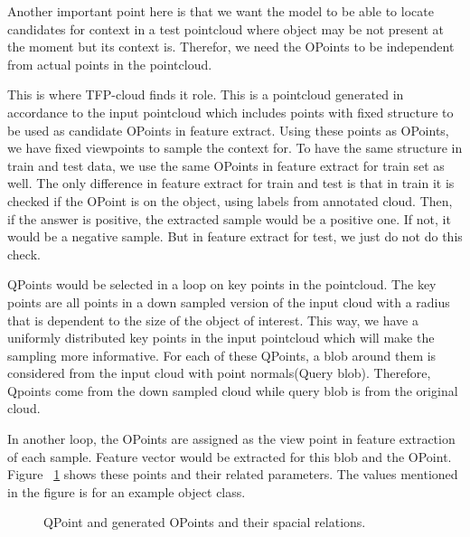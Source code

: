 Another important point here is that we want the model to be able to locate candidates for context in a test pointcloud where 
object may be not present at the moment but its context is.
Therefor, we need the OPoints to be independent from actual points in the pointcloud.

This is where TFP-cloud finds it role.
This is a pointcloud generated in accordance to the input pointcloud which includes points with fixed structure to be used as 
candidate OPoints in feature extract.
Using these points as OPoints, we have fixed viewpoints to sample the context for. 
To have the same structure in train and test data, we use the same OPoints in feature extract for train set as well.
The only difference in feature extract for train and test is that in train it is checked if the OPoint is on the object, using 
labels from annotated cloud. 
Then, if the answer is positive, the extracted sample would be a positive one. 
If not, it would be a negative sample. 
But in feature extract for test, we just do not do this check.

QPoints would be selected in a loop on key points in the pointcloud. 
The key points are all points in a down sampled version of the input cloud with a radius that is dependent to the 
size of the object of interest. 
This way, we have a uniformly distributed key points in the input pointcloud which will make the sampling more informative.
For each of these QPoints, a blob around them is considered from the input cloud with point normals(Query blob).
Therefore, Qpoints come from the down sampled cloud while query blob is from the original cloud.

In another loop, the OPoints are assigned  as the view point in feature extraction of each sample. 
Feature vector would be extracted for this blob and the OPoint. 
Figure ~\ref{PointParameters_Diagram.figure} shows these points and their related parameters. 
The values mentioned in the figure is for an example object class.

\begin{figure}[t]
  \caption[Feature extract structure]
  {QPoint and generated OPoints and their spacial relations.}
  \label{PointParameters_Diagram.figure}
\end{figure}

